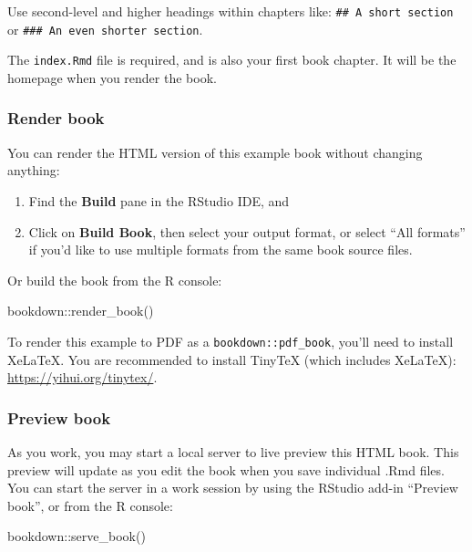 \documentclass[
]{bxjsbook}
\newenvironment{Shaded}{\begin{snugshade}}{\end{snugshade}}
\newcommand{\FunctionTok}[1]{\textcolor[rgb]{0.00,0.00,0.00}{#1}}
\newcommand{\NormalTok}[1]{#1}
\newcommand{\SpecialCharTok}[1]{\textcolor[rgb]{0.00,0.00,0.00}{#1}}
\theoremstyle{definition}
\theoremstyle{definition}
\theoremstyle{definition}
\theoremstyle{definition}
\theoremstyle{remark}
\begin{document}
Use second-level and higher headings within chapters like: \texttt{\#\#\ A\ short\ section} or \texttt{\#\#\#\ An\ even\ shorter\ section}.

The \texttt{index.Rmd} file is required, and is also your first book chapter. It will be the homepage when you render the book.

\hypertarget{render-book}{%
\subsubsection{Render book}\label{render-book}}

You can render the HTML version of this example book without changing anything:

\begin{enumerate}
\def\labelenumi{\arabic{enumi}.}
\item
  Find the \textbf{Build} pane in the RStudio IDE, and
\item
  Click on \textbf{Build Book}, then select your output format, or select ``All formats'' if you'd like to use multiple formats from the same book source files.
\end{enumerate}

Or build the book from the R console:

\begin{Shaded}
\begin{Highlighting}[]
\NormalTok{bookdown}\SpecialCharTok{::}\FunctionTok{render\_book}\NormalTok{()}
\end{Highlighting}
\end{Shaded}

To render this example to PDF as a \texttt{bookdown::pdf\_book}, you'll need to install XeLaTeX. You are recommended to install TinyTeX (which includes XeLaTeX): \url{https://yihui.org/tinytex/}.

\hypertarget{preview-book}{%
\subsubsection{Preview book}\label{preview-book}}

As you work, you may start a local server to live preview this HTML book. This preview will update as you edit the book when you save individual .Rmd files. You can start the server in a work session by using the RStudio add-in ``Preview book'', or from the R console:

\begin{Shaded}
\begin{Highlighting}[]
\NormalTok{bookdown}\SpecialCharTok{::}\FunctionTok{serve\_book}\NormalTok{()}
\end{Highlighting}
\end{Shaded}
\end{document}
